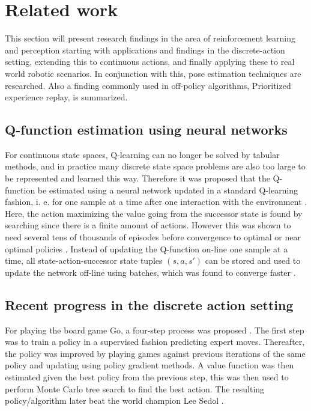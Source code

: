 \section{Related work}

This section will present research findings in the area of reinforcement
learning and perception starting with applications and findings in the
discrete-action setting, extending this to continuous actions, and finally
applying these to real world robotic scenarios. In conjunction with this, pose
estimation techniques are researched. Also a finding commonly used in
off-policy algorithms, Prioritized experience replay, is summarized.


\subsection{Q-function estimation using neural networks}

For continuous state spaces, Q-learning can no longer be solved by tabular
methods, and in practice many discrete state space problems are also too large
to be represented and learned this way. Therefore it was proposed that the
Q-function be estimated using a neural network updated in a standard Q-learning
fashion, i. e. for one sample at a time after one interaction with the
environment \cite{riedmiller1999concepts}. Here, the action maximizing the
value going from the successor state is found by searching since there is a
finite amount of actions. However this was shown to need several tens of
thousands of episodes before convergence to optimal or near optimal policies
\cite{riedmiller1999concepts}. Instead of updating the Q-function on-line one
sample at a time, all state-action-successor state tuples $(s, a, s')$ can be
stored and used to update the network off-line using batches, which was found
to converge faster \cite{riedmiller2005neural}.

\subsection{Recent progress in the discrete action setting}

For playing the board game Go, a four-step process was proposed
\cite{silver2016mastering}. The first step was to train a policy in a
supervised fashion predicting expert moves. Thereafter, the policy was improved
by playing games against previous iterations of the same policy and updating
using policy gradient methods. A value function was then estimated given the
best policy from the previous step, this was then used to perform Monte Carlo
tree search to find the best action. The resulting policy/algorithm later beat the world
champion Lee Sedol \cite{deepmind_2017}.

